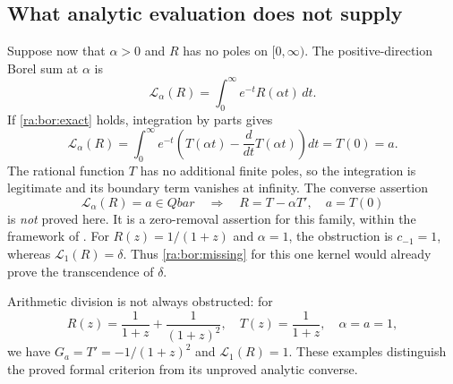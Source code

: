 \documentclass[11pt,a4paper]{article}
\newcommand{\QB}{\overline{\mathbb Q}}
\newcommand{\Qbar}{\overline{\mathbb Q}}
\theoremstyle{definition}
\theoremstyle{remark}
\theoremstyle{plain}
\numberwithin{equation}{section}
\def\Qbar{Qbar}\def\QB{Qbar}\def\mathbb#1{#1}%
\begin{document}
\subsection{What analytic evaluation does not supply}
Suppose now that $\alpha>0$ and $R$ has no poles on $[0,\infty)$.
The positive-direction Borel sum at $\alpha$ is
\[
 \mathcal L_\alpha(R)=\int_0^\infty e^{-t}R(\alpha t)\,dt.
\]
If \eqref{ra:bor:exact} holds, integration by parts gives
\begin{equation}\label{ra:bor:integral-exact}
 \mathcal L_\alpha(R)
 =\int_0^\infty e^{-t}
   \left(T(\alpha t)-\frac{d}{dt}T(\alpha t)\right)dt
 =T(0)=a.
\end{equation}
The rational function $T$ has no additional finite poles, so the
integration is legitimate and its boundary term vanishes at infinity.
The converse assertion
\begin{equation}\label{ra:bor:missing}
 \mathcal L_\alpha(R)=a\in\Qbar
 \quad\Longrightarrow\quad
 R=T-\alpha T',\quad a=T(0)
\end{equation}
is \emph{not} proved here.  It is a zero-removal assertion for this
family, within the framework of \cite[Conjecture~2]{FRmixed}.
For $R(z)=1/(1+z)$ and $\alpha=1$, the obstruction is $c_{-1}=1$,
whereas $\mathcal L_1(R)=\delta$.  Thus \eqref{ra:bor:missing} for this
one kernel would already prove the transcendence of $\delta$.

Arithmetic division is not always obstructed: for
\[
 R(z)=\frac1{1+z}+\frac1{(1+z)^2},\quad
 T(z)=\frac1{1+z},\quad \alpha=a=1,
\]
we have $G_a=T'=-1/(1+z)^2$ and $\mathcal L_1(R)=1$.
These examples distinguish the proved formal criterion from its
unproved analytic converse.
\end{document}
